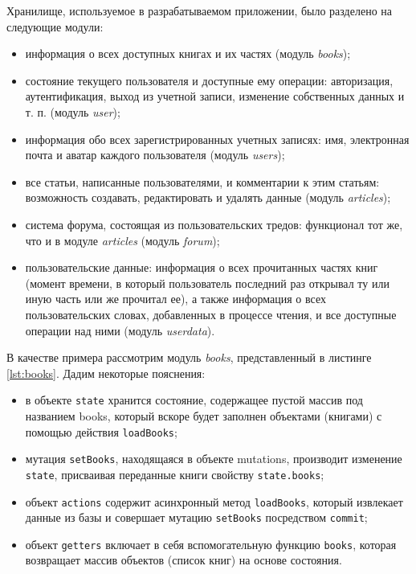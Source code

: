Хранилище, используемое в разрабатываемом приложении, было разделено на следующие модули:

\begin{itemize}
	\item информация о всех доступных книгах и их частях (модуль \textit{books});
	\item состояние текущего пользователя и доступные ему операции: авторизация, аутентификация, выход из учетной записи, изменение собственных данных и т. п. (модуль \textit{user});
	\item информация обо всех зарегистрированных учетных записях: имя, электронная почта и аватар каждого пользователя (модуль \textit{users});
	\item все статьи, написанные пользователями, и комментарии к этим статьям: возможность создавать, редактировать и удалять данные (модуль \textit{articles});
	\item система форума, состоящая из пользовательских тредов: функционал тот же, что и в модуле \textit{articles} (модуль \textit{forum});
	\item пользовательские данные: информация о всех прочитанных частях книг (момент времени, в который пользователь последний раз открывал ту или иную часть или же прочитал ее), а также информация о всех пользовательских словах, добавленных в процессе чтения, и все доступные операции над ними (модуль \textit{userdata}).
\end{itemize}

В качестве примера рассмотрим модуль \textit{books}, представленный в листинге \ref{lst:books}. Дадим некоторые пояснения:

\begin{itemize}
	\item в объекте \texttt{state} хранится состояние, содержащее пустой массив под названием books, который вскоре будет заполнен объектами (книгами) с помощью действия \texttt{loadBooks};
	\item мутация \texttt{setBooks}, находящаяся в объекте mutations, производит изменение \texttt{state}, присваивая переданные книги свойству \texttt{state.books};
	\item объект \texttt{actions} содержит асинхронный метод \texttt{loadBooks}, который извлекает данные из базы и совершает мутацию \texttt{setBooks} посредством \texttt{commit};
	\item объект \texttt{getters} включает в себя вспомогательную функцию \texttt{books}, которая возвращает массив объектов (список книг) на основе состояния.
\end{itemize}

